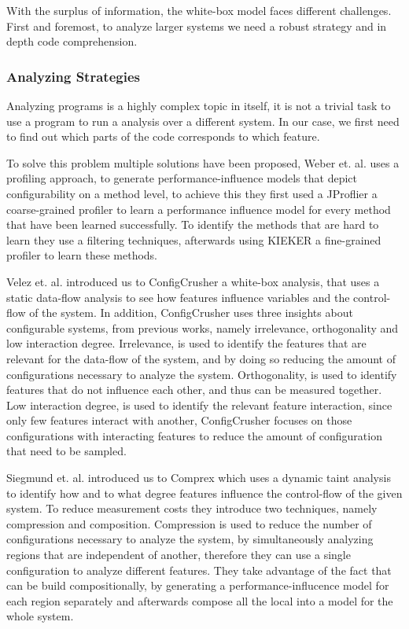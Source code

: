 With the surplus of information, the white-box model faces different challenges. 
First and foremost, to analyze larger systems we need a robust strategy and in depth code comprehension.

\subsubsection{Analyzing Strategies}
Analyzing programs is a highly complex topic in itself, it is not a trivial task to use a program to run a analysis over a different system.
In our case, we first need to find out which parts of the code corresponds to which feature.

To solve this problem multiple solutions have been proposed, Weber et. al. \cite{White-box-Profiling} uses a profiling approach, to generate 
performance-influence models that depict configurability on a method level, to achieve this they first used a JProflier a coarse-grained profiler
to learn a performance influence model for every method that have been learned successfully. 
To identify the methods that are hard to learn they use a filtering techniques, afterwards using KIEKER a fine-grained profiler to learn these methods.

Velez et. al. introduced us to ConfigCrusher \cite{ConfigCrusher} a white-box analysis, that uses a static data-flow analysis to see how features influence 
variables and the control-flow of the system. In addition, ConfigCrusher uses three insights about configurable systems, from previous works, namely
irrelevance, orthogonality and low interaction degree. Irrelevance, is used to identify the features that are relevant for the data-flow of the system, and by
doing so reducing the amount of configurations necessary to analyze the system. Orthogonality, is used to identify features that do not influence each other, and
thus can be measured together. Low interaction degree, is used to identify the relevant feature interaction, since only few features interact with another, 
ConfigCrusher focuses on those configurations with interacting features to reduce the amount of configuration that need to be sampled.

Siegmund et. al. introduced us to Comprex \cite{Comprex} which uses a dynamic taint analysis to identify how
and to what degree features influence the control-flow of the given system. 
To reduce measurement costs they introduce two techniques, namely compression and composition. 
Compression is used to reduce the number of configurations necessary to analyze the system,
by simultaneously analyzing regions that are independent of another, therefore they can use a single configuration to 
analyze different features. 
They take advantage of the fact that \perfInfluenceModel can be build compositionally, by generating a performance-influcence model for each region separately
and afterwards compose all the local \perfInfluenceModel into a model for the whole system.

